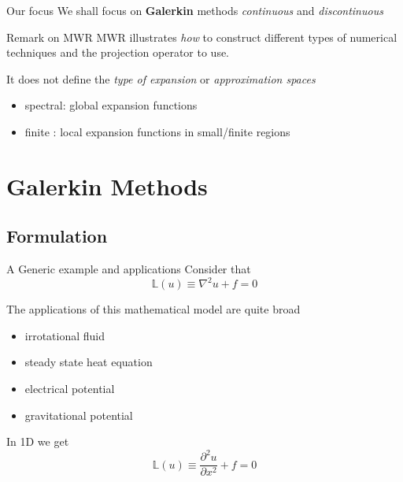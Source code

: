 \begin{frame}{Our focus}
  We shall focus on \textbf{Galerkin} methods \emph{continuous} and \emph{discontinuous}

  \begin{block}{Remark on MWR}
    MWR illustrates \emph{how} to construct different types of
    numerical techniques and the projection operator to use.

    It does not define the \emph{type of expansion} or \emph{approximation spaces}
  \end{block}
  
  \begin{itemize}
  \item spectral: global expansion functions
  \item finite : local expansion functions in small/finite regions
  \end{itemize}
\end{frame}

\section{Galerkin Methods}
\label{sec:galerkin-methods}

\subsection{Formulation}
\label{sec:formulation-1}

\begin{frame}{A Generic example and applications}
  Consider that 
  \begin{equation}
    \label{eq:8}
    \mathbb{L}(u) \equiv \nabla^2 u + f = 0
  \end{equation}

  
  The applications of this mathematical model are quite broad
  \begin{itemize}
  \item irrotational fluid
  \item steady state heat equation
  \item electrical potential
  \item gravitational potential
  \end{itemize}
  
In 1D we get
\begin{equation}
  \label{eq:9}
  \mathbb{L}(u) \equiv \frac{\partial^2 u}{\partial x^2} + f = 0
\end{equation}
\end{frame}

